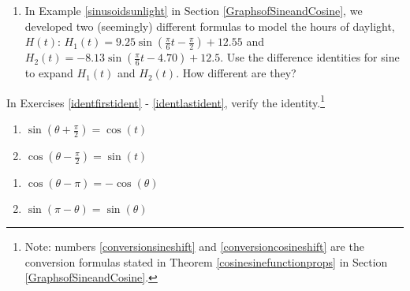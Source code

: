 \documentclass{ximera}
\begin{document}
\begin{enumerate}

\setcounter{enumi}{\value{HW}}

\item  \label{twodaylightfunctions} In Example \ref{sinusoidsunlight} in Section \ref{GraphsofSineandCosine}, we developed two (seemingly) different formulas to model the hours of daylight, $H(t)$:   $H_{1}(t) = 9.25 \sin\left(\frac{\pi}{6} t - \frac{\pi}{2}\right) + 12.55$ and  $H_{2}(t) = -8.13 \sin\left(\frac{\pi}{6} t - 4.70\right)+ 12.5$.  Use the difference identities for sine to expand $H_{1}(t)$ and $H_{2}(t)$.  How different are they?
\setcounter{HW}{\value{enumi}}
\end{enumerate}




In Exercises \ref{identfirstident} - \ref{identlastident}, verify the identity.\footnote{Note: numbers \ref{conversionsineshift} and \ref{conversioncosineshift} are the conversion formulas stated in Theorem \ref{cosinesinefunctionprops} in Section \ref{GraphsofSineandCosine}.}

\begin{multicols}{2}

\begin{enumerate}

\setcounter{enumi}{\value{HW}}

\item  $\sin\left(\theta + \frac{\pi}{2}\right) = \cos(t)$  \label{identfirstident} \label{conversionsineshift}
\item $\cos\left(\theta - \frac{\pi}{2} \right) = \sin(t)$ \label{conversioncosineshift}

\setcounter{HW}{\value{enumi}}

\end{enumerate}

\end{multicols}


\begin{multicols}{2}

\begin{enumerate}

\setcounter{enumi}{\value{HW}}

\item $\cos(\theta - \pi) = -\cos(\theta)$
\item $\sin(\pi - \theta) = \sin(\theta)$

\setcounter{HW}{\value{enumi}}

\end{enumerate}

\end{multicols}
\end{document}
